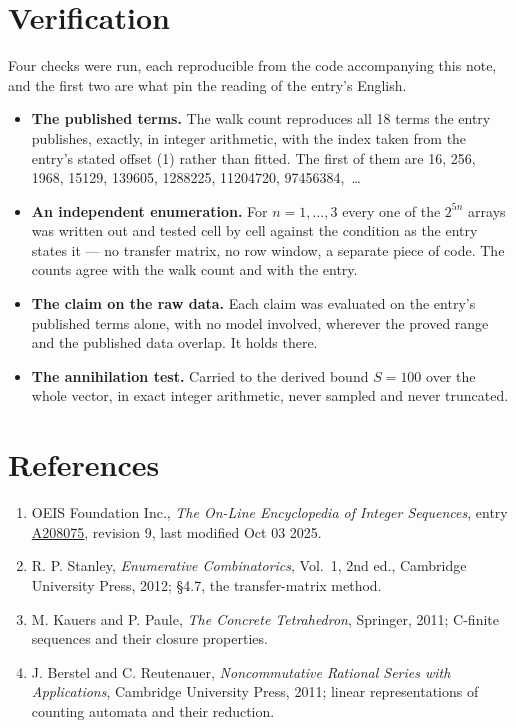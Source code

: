 \documentclass[11pt]{article}
\theoremstyle{definition}
\begin{document}
\section{Verification}

Four checks were run, each reproducible from the code accompanying this note, and the first two are what pin the reading of the entry's English.

\begin{itemize}

\item {\bfseries The published terms.} The walk count reproduces all 18 terms the entry publishes, exactly, in integer arithmetic, with the index taken from the entry's stated offset (1) rather than fitted. The first of them are 16, 256, 1968, 15129, 139605, 1288225, 11204720, 97456384,~\dots

\item {\bfseries An independent enumeration.} For $n = 1,\dots,3$ every one of the $2^{5n}$ arrays was written out and tested cell by cell against the condition as the entry states it --- no transfer matrix, no row window, a separate piece of code. The counts agree with the walk count and with the entry.

\item {\bfseries The claim on the raw data.} Each claim was evaluated on the entry's published terms alone, with no model involved, wherever the proved range and the published data overlap. It holds there.

\item {\bfseries The annihilation test.} Carried to the derived bound $S = 100$ over the whole vector, in exact integer arithmetic, never sampled and never truncated.

\end{itemize}

\section{References}

\begin{enumerate}

\item OEIS Foundation Inc., \emph{The On-Line Encyclopedia of Integer Sequences}, entry \href{https://oeis.org/A208075}{A208075}, revision 9, last modified Oct 03 2025.

\item R. P. Stanley, \emph{Enumerative Combinatorics}, Vol.~1, 2nd ed., Cambridge University Press, 2012; \S4.7, the transfer-matrix method.

\item M. Kauers and P. Paule, \emph{The Concrete Tetrahedron}, Springer, 2011; C-finite sequences and their closure properties.

\item J. Berstel and C. Reutenauer, \emph{Noncommutative Rational Series with Applications}, Cambridge University Press, 2011; linear representations of counting automata and their reduction.

\end{enumerate}
\end{document}
